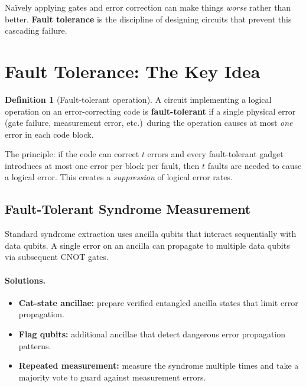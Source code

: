 \documentclass[11pt]{article}
\theoremstyle{definition}
\newtheorem{definition}{Definition}[section]
\begin{document}
Na\"ively applying gates and error correction can make things \emph{worse} rather than better.  \textbf{Fault tolerance} is the discipline of designing circuits that prevent this cascading failure.

\section{Fault Tolerance: The Key Idea}

\begin{definition}[Fault-tolerant operation]
A circuit implementing a logical operation on an error-correcting code is \textbf{fault-tolerant} if a single physical error (gate failure, measurement error, etc.)\ during the operation causes at most \emph{one} error in each code block.
\end{definition}

The principle: if the code can correct $t$ errors and every fault-tolerant gadget introduces at most one error per block per fault, then $t$ faults are needed to cause a logical error.  This creates a \emph{suppression} of logical error rates.

\subsection{Fault-Tolerant Syndrome Measurement}

Standard syndrome extraction uses ancilla qubits that interact sequentially with data qubits.  A single error on an ancilla can propagate to multiple data qubits via subsequent CNOT gates.

\paragraph{Solutions.}
\begin{itemize}
    \item \textbf{Cat-state ancillae:} prepare verified entangled ancilla states that limit error propagation.
    \item \textbf{Flag qubits:} additional ancillae that detect dangerous error propagation patterns.
    \item \textbf{Repeated measurement:} measure the syndrome multiple times and take a majority vote to guard against measurement errors.
\end{itemize}
\end{document}
